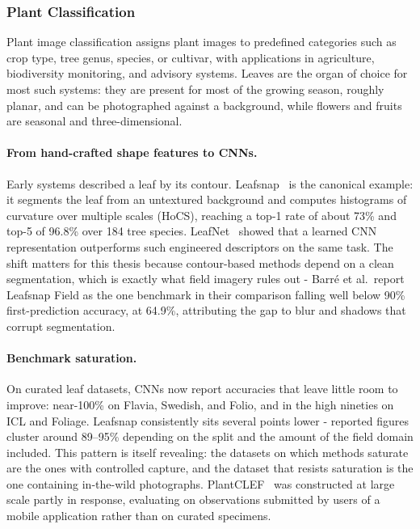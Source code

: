 \documentclass[12pt,a4paper]{article}
\begin{document}
\subsubsection{Plant Classification}
Plant image classification assigns plant images to predefined categories such as crop type, tree genus, species, or cultivar, with applications in agriculture, biodiversity monitoring, and advisory systems. Leaves are the organ of choice for most such systems: they are present for most of the growing season, roughly planar, and can be photographed against a background, while flowers and fruits are seasonal and three-dimensional.

\paragraph{From hand-crafted shape features to CNNs.} Early systems described a leaf by its contour. Leafsnap~\cite{kumar2012} is the canonical example: it segments the leaf from an untextured background and computes histograms of curvature over multiple scales (HoCS), reaching a top-1 rate of about 73\% and top-5 of 96.8\% over 184 tree species. LeafNet~\cite{barre2017} showed that a learned CNN representation outperforms such engineered descriptors on the same task. The shift matters for this thesis because contour-based methods depend on a clean segmentation, which is exactly what field imagery rules out - Barr\'e et al.\ report Leafsnap Field as the one benchmark in their comparison falling well below 90\% first-prediction accuracy, at 64.9\%, attributing the gap to blur and shadows that corrupt segmentation.

\paragraph{Benchmark saturation.} On curated leaf datasets, CNNs now report accuracies that leave little room to improve: near-100\% on Flavia, Swedish, and Folio, and in the high nineties on ICL and Foliage. Leafsnap consistently sits several points lower - reported figures cluster around 89--95\% depending on the split and the amount of the field domain included. This pattern is itself revealing: the datasets on which methods saturate are the ones with controlled capture, and the dataset that resists saturation is the one containing in-the-wild photographs. PlantCLEF~\cite{goeau2017} was constructed at large scale partly in response, evaluating on observations submitted by users of a mobile application rather than on curated specimens.
\end{document}
